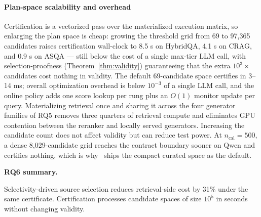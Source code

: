 \paragraph{Plan-space scalability and overhead}
Certification is a vectorized pass over the materialized execution
matrix, so enlarging the plan space is cheap: growing the threshold
grid from 69 to 97{,}365 candidates raises certification wall-clock to
8.5 s on HybridQA, 4.1 s on CRAG, and 0.9 s on ASQA --- still below the
cost of a single max-tier LLM call, with selection-proofness
(Theorem~\ref{thm:validity}) guaranteeing that the extra
$10^3\times$ candidates cost nothing in validity. The default
69-candidate space certifies in 3--14 ms; overall optimization overhead
is below $10^{-3}$ of a single LLM call, and the online policy adds one
score lookup per rung plus an $O(1)$ monitor update per query.
Materializing retrieval once and sharing it across the four generator
families of RQ5 removes three quarters of retrieval compute and
eliminates GPU contention between the reranker and locally served
generators. Increasing the candidate count does not affect validity but
can reduce test power. At
$n_{\mathrm{cal}} = 500$, a dense 8{,}029-candidate grid reaches the
contract boundary sooner on Qwen and certifies nothing, which is why
\system\ ships the compact curated space as the default.

\smallskip\noindent\textbf{RQ6 summary.}\par
Selectivity-driven source selection reduces retrieval-side cost by 31\%
under the same certificate. Certification processes candidate spaces of
size $10^5$ in seconds without changing validity.

